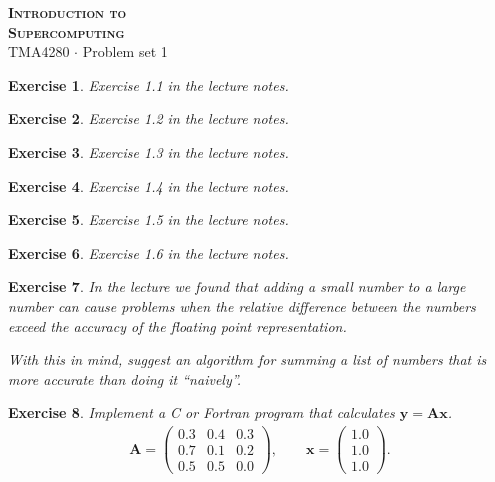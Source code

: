 \documentclass[onecolumn, oneside, a4paper, 11pt]{memoir}
\newtheorem{ex}{Exercise}
\begin{document}
\pagestyle{empty}

\begin{center}
  {\Huge \bfseries \scshape
    Introduction to \\[0.2\baselineskip] Supercomputing} \\[2\baselineskip]
  {\Large TMA4280 $\cdot$ Problem set 1} \\[2\baselineskip]
\end{center}

\begin{ex}
  Exercise 1.1 in the lecture notes.
\end{ex}

\begin{ex}
  Exercise 1.2 in the lecture notes.
\end{ex}

\begin{ex}
  Exercise 1.3 in the lecture notes.
\end{ex}

\begin{ex}
  Exercise 1.4 in the lecture notes.
\end{ex}

\begin{ex}
  Exercise 1.5 in the lecture notes.
\end{ex}

\begin{ex}
  Exercise 1.6 in the lecture notes.
\end{ex}

\begin{ex}
  In the lecture we found that adding a small number to a large number can cause
  problems when the relative difference between the numbers exceed the accuracy
  of the floating point representation.

  With this in mind, suggest an algorithm for summing a list of numbers that is
  more accurate than doing it ``naively''.
\end{ex}

\begin{ex}
  Implement a C or Fortran program that calculates $\bm y = \bm A \bm x$.
  \begin{align*}
    \bm A =
    \begin{pmatrix}
      0.3 & 0.4 & 0.3 \\
      0.7 & 0.1 & 0.2 \\
      0.5 & 0.5 & 0.0
    \end{pmatrix}, \qquad \bm x = \begin{pmatrix} 1.0 \\ 1.0 \\ 1.0 \end{pmatrix}.
  \end{align*}
\end{ex}
\end{document}
